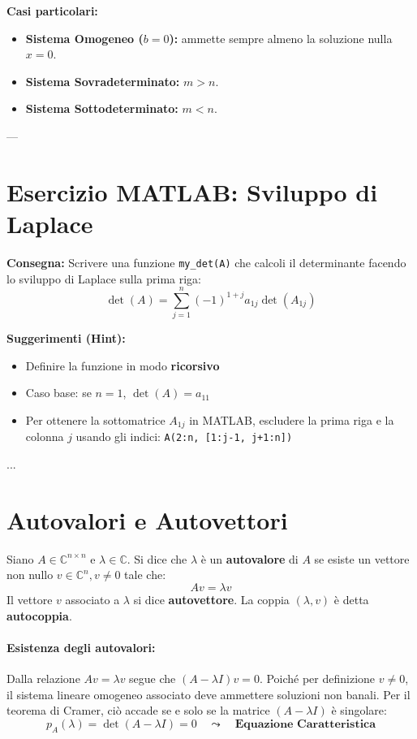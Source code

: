 \documentclass[a4paper,12pt]{article}
\begin{document}
	\textbf{Casi particolari:}
	\begin{itemize}
		\item \textbf{Sistema Omogeneo ($b=0$):} ammette sempre almeno la soluzione nulla $x=0$.
		\item \textbf{Sistema Sovradeterminato:} $m > n$.
		\item \textbf{Sistema Sottodeterminato:} $m < n$.
	\end{itemize}
	
	---
	
	\section*{Esercizio MATLAB: Sviluppo di Laplace}
	
	\textbf{Consegna:} Scrivere una funzione \texttt{my\_det(A)} che calcoli il determinante facendo lo sviluppo di Laplace sulla prima riga:
	\[ \det(A) = \sum_{j=1}^{n} (-1)^{1+j} a_{1j} \det(A_{1j}) \]
	
	\textbf{Suggerimenti (Hint):}
	\begin{itemize}
		\item Definire la funzione in modo \textbf{ricorsivo}
		\item Caso base: se $n=1$, $\det(A) = a_{11}$
		\item Per ottenere la sottomatrice $A_{1j}$ in MATLAB, escludere la prima riga e la colonna $j$ usando gli indici: \texttt{A(2:n, [1:j-1, j+1:n])}
	\end{itemize}
	...
	
	\section{Autovalori e Autovettori}
	
	\begin{tcolorbox}[title=Definizione]
		Siano $A \in \mathbb{C}^{n \times n}$ e $\lambda \in \mathbb{C}$. Si dice che $\lambda$ è un \textbf{autovalore} di $A$ se esiste un vettore non nullo $v \in \mathbb{C}^n, v \neq 0$ tale che:
		\begin{equation}
			A v = \lambda v
		\end{equation}
		Il vettore $v$ associato a $\lambda$ si dice \textbf{autovettore}. La coppia $(\lambda, v)$ è detta \textbf{autocoppia}.
	\end{tcolorbox}
	
	\paragraph{Esistenza degli autovalori:} 
	Dalla relazione $Av = \lambda v$ segue che $(A - \lambda I)v = 0$. Poiché per definizione $v \neq 0$, il sistema lineare omogeneo associato deve ammettere soluzioni non banali. Per il teorema di Cramer, ciò accade se e solo se la matrice $(A - \lambda I)$ è singolare:
	\begin{equation*}
		p_A(\lambda) = \det(A - \lambda I) = 0 \quad \leadsto \quad \textbf{Equazione Caratteristica}
	\end{equation*}
	
\end{document}
